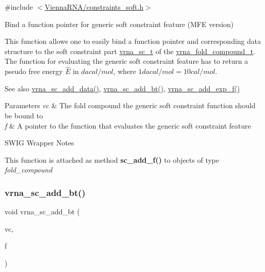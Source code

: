{\ttfamily \#include $<$\hyperlink{constraints__soft_8h}{Vienna\+R\+N\+A/constraints\+\_\+soft.\+h}$>$}



Bind a function pointer for generic soft constraint feature (M\+FE version) 

This function allows one to easily bind a function pointer and corresponding data structure to the soft constraint part \hyperlink{group__soft__constraints_ga75401ce219ef8dbcceb672db82d434c6}{vrna\+\_\+sc\+\_\+t} of the \hyperlink{group__fold__compound_ga1b0cef17fd40466cef5968eaeeff6166}{vrna\+\_\+fold\+\_\+compound\+\_\+t}. The function for evaluating the generic soft constraint feature has to return a pseudo free energy $ \hat{E} $ in $ dacal/mol $, where $ 1 dacal/mol = 10 cal/mol $.

\begin{DoxySeeAlso}{See also}
\hyperlink{group__soft__constraints_ga15c6d52471ec97897e2bb7f964f5deb6}{vrna\+\_\+sc\+\_\+add\+\_\+data()}, \hyperlink{group__soft__constraints_gabde7d07a79bb9a8f4721aee247b674ea}{vrna\+\_\+sc\+\_\+add\+\_\+bt()}, \hyperlink{group__soft__constraints_ga87e382b5d0c9b7d9ce1b79c0473ff700}{vrna\+\_\+sc\+\_\+add\+\_\+exp\+\_\+f()}
\end{DoxySeeAlso}

\begin{DoxyParams}{Parameters}
{\em vc} & The fold compound the generic soft constraint function should be bound to \\
\hline
{\em f} & A pointer to the function that evaluates the generic soft constraint feature\\
\hline
\end{DoxyParams}
\begin{DoxyRefDesc}{S\+W\+I\+G Wrapper Notes}
\item[\hyperlink{wrappers__wrappers000022}{S\+W\+I\+G Wrapper Notes}]This function is attached as method {\bfseries sc\+\_\+add\+\_\+f()} to objects of type {\itshape fold\+\_\+compound} \end{DoxyRefDesc}
\mbox{\label{group__soft__constraints_gabde7d07a79bb9a8f4721aee247b674ea}} 
\subsubsection{\texorpdfstring{vrna\+\_\+sc\+\_\+add\+\_\+bt()}{vrna\_sc\_add\_bt()}}
{\footnotesize\ttfamily void vrna\+\_\+sc\+\_\+add\+\_\+bt (\begin{DoxyParamCaption}\item[{\hyperlink{group__fold__compound_ga1b0cef17fd40466cef5968eaeeff6166}{vrna\+\_\+fold\+\_\+compound\+\_\+t} $\ast$}]{vc,  }\item[{\hyperlink{group__soft__constraints_gaeb6448da6c593d4c489c7fbadcb99499}{vrna\+\_\+callback\+\_\+sc\+\_\+backtrack} $\ast$}]{f }\end{DoxyParamCaption})}



